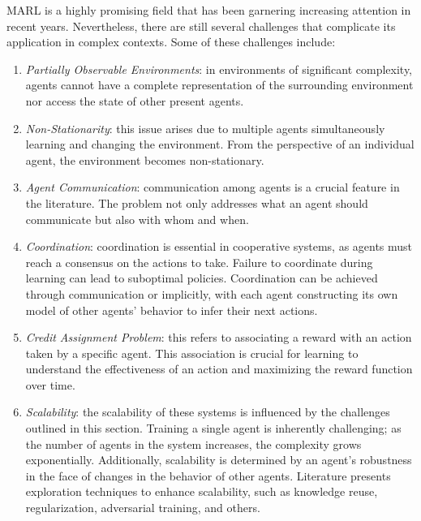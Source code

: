 \documentclass[12pt,a4paper,openright,twoside]{book}
\begin{document}
MARL is a highly promising field that has been garnering increasing attention in recent years. Nevertheless, there are still several challenges that complicate its application in complex contexts. Some of these challenges include:
\begin{enumerate}
   

    \item  \emph{Partially Observable Environments}: in environments of significant complexity, agents cannot have a complete representation of the surrounding environment nor access the state of other present agents.
   
    \item \emph{Non-Stationarity}: this issue arises due to multiple agents simultaneously learning and changing the environment. From the perspective of an individual agent, the environment becomes non-stationary.
   
    \item  \emph{Agent Communication}: communication among agents is a crucial feature in the literature. The problem not only addresses what an agent should communicate but also with whom and when.
   
    \item  \emph{Coordination}: coordination is essential in cooperative systems, as agents must reach a consensus on the actions to take. Failure to coordinate during learning can lead to suboptimal policies. Coordination can be achieved through communication or implicitly, with each agent constructing its own model of other agents' behavior to infer their next actions.
   
    \item  \emph{Credit Assignment Problem}: this refers to associating a reward with an action taken by a specific agent. This association is crucial for learning to understand the effectiveness of an action and maximizing the reward function over time.
   
    \item  \emph{Scalability}: the scalability of these systems is influenced by the challenges outlined in this section. Training a single agent is inherently challenging; as the number of agents in the system increases, the complexity grows exponentially. Additionally, scalability is determined by an agent's robustness in the face of changes in the behavior of other agents. Literature presents exploration techniques to enhance scalability, such as knowledge reuse, regularization, adversarial training, and others.
\end{enumerate}
\end{document}
